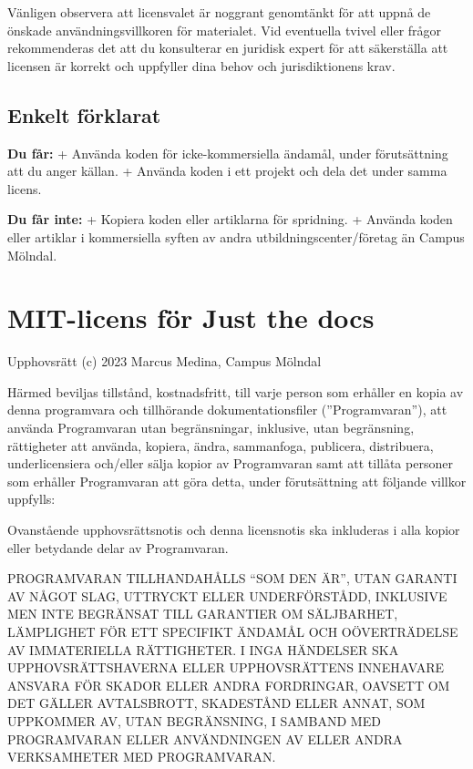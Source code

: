 Vänligen observera att licensvalet är noggrant genomtänkt för att uppnå
de önskade användningsvillkoren för materialet. Vid eventuella tvivel
eller frågor rekommenderas det att du konsulterar en juridisk expert för
att säkerställa att licensen är korrekt och uppfyller dina behov och
jurisdiktionens krav.

\hypertarget{enkelt-fuxf6rklarat}{%
\subsection{Enkelt förklarat}\label{enkelt-fuxf6rklarat}}

\textbf{Du får:} + Använda koden för icke-kommersiella ändamål, under
förutsättning att du anger källan. + Använda koden i ett projekt och
dela det under samma licens.

\textbf{Du får inte:} + Kopiera koden eller artiklarna för spridning. +
Använda koden eller artiklar i kommersiella syften av andra
utbildningscenter/företag än Campus Mölndal.

\hypertarget{mit-licens-fuxf6r-just-the-docs}{%
\section{MIT-licens för Just the
docs}\label{mit-licens-fuxf6r-just-the-docs}}

Upphovsrätt (c) 2023 Marcus Medina, Campus Mölndal

Härmed beviljas tillstånd, kostnadsfritt, till varje person som erhåller
en kopia av denna programvara och tillhörande dokumentationsfiler
(''Programvaran''), att använda Programvaran utan begränsningar,
inklusive, utan begränsning, rättigheter att använda, kopiera, ändra,
sammanfoga, publicera, distribuera, underlicensiera och/eller sälja
kopior av Programvaran samt att tillåta personer som erhåller
Programvaran att göra detta, under förutsättning att följande villkor
uppfylls:

Ovanstående upphovsrättsnotis och denna licensnotis ska inkluderas i
alla kopior eller betydande delar av Programvaran.

PROGRAMVARAN TILLHANDAHÅLLS ``SOM DEN ÄR'', UTAN GARANTI AV NÅGOT SLAG,
UTTRYCKT ELLER UNDERFÖRSTÅDD, INKLUSIVE MEN INTE BEGRÄNSAT TILL
GARANTIER OM SÄLJBARHET, LÄMPLIGHET FÖR ETT SPECIFIKT ÄNDAMÅL OCH
OÖVERTRÄDELSE AV IMMATERIELLA RÄTTIGHETER. I INGA HÄNDELSER SKA
UPPHOVSRÄTTSHAVERNA ELLER UPPHOVSRÄTTENS INNEHAVARE ANSVARA FÖR SKADOR
ELLER ANDRA FORDRINGAR, OAVSETT OM DET GÄLLER AVTALSBROTT, SKADESTÅND
ELLER ANNAT, SOM UPPKOMMER AV, UTAN BEGRÄNSNING, I SAMBAND MED
PROGRAMVARAN ELLER ANVÄNDNINGEN AV ELLER ANDRA VERKSAMHETER MED
PROGRAMVARAN.

